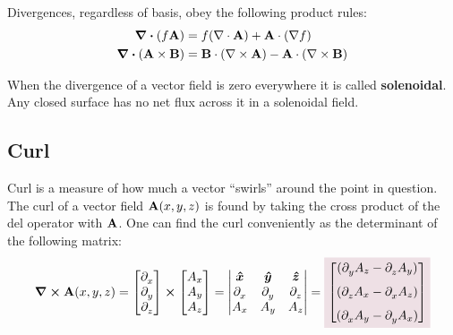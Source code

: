         Divergences, regardless of basis, obey the following product rules:
        \begin{align*}
            \div(f\vb{A}) &= f(\nabla \cdot \vb{A}) + \vb{A} \cdot (\nabla f)
            \\
            \div{(\vb{A} \times \vb{B})} &= \vb{B} \cdot (\nabla \times \vb{A}) - \vb{A} \cdot (\nabla \times \vb{B})
        \end{align*}

        When the divergence of a vector field is zero everywhere it is called {\bf solenoidal}. Any closed surface has no net flux across it in a solenoidal field.
    \newpage    
    \subsection*{Curl}
        Curl is a measure of how much a vector ``swirls'' around the point in question. The curl of a vector field \(\vb{A}(x,y,z)\) is found by taking the cross product of the del operator with \(\vb{A}\). One can find the curl conveniently as the determinant of the following matrix: 
        \begin{align}
            \curl \vb{A}(x,y,z) 
            = 
            \begin{bmatrix}
                \pder*{x}\\\pder*{y}\\\pder*{z}
            \end{bmatrix}
            \cross
            \begin{bmatrix}
                A_x\\A_y\\A_z
            \end{bmatrix}
            =
            \begin{vmatrix}
            \e{x}&\e{y}&\e{z}
            \\
            \pder*{x}&\pder*{y}&\pder*{z}
            \\
            A_x&A_y&A_z
            \end{vmatrix}
            =
            \coloredanswer{
            \begin{bmatrix}
            (\pder*{y} A_z-\pder*{z} A_y)
            \\[0.25 cm]
            (\pder*{z} A_x-\pder*{x} A_z)
            \\[0.25 cm]
            (\pder*{x} A_y-\pder*{y} A_x)
            \end{bmatrix}}
        \end{align}
